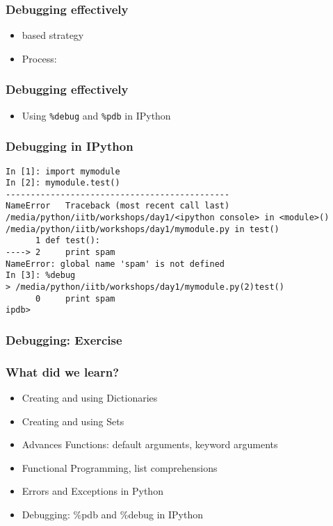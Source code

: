 \documentclass[14pt,compress]{beamer}
\newcounter{time}
\newcommand{\inctime}[1]{\addtocounter{time}{#1}{\tiny \thetime\ m}}
\newcommand{\typ}[1]{\texttt{#1}}
\newcommand{\kwrd}[1]{ \texttt{\textbf{\color{blue}{#1}}}  }
\begin{document}
\begin{frame}[fragile]
    \frametitle{Debugging effectively}
    \begin{itemize}
        \item \kwrd{print} based strategy
        \item Process:
    \end{itemize}
\end{frame}

\begin{frame}[fragile]
    \frametitle{Debugging effectively}
    \begin{itemize}
      \item Using \typ{\%debug} and \typ{\%pdb} in IPython
    \end{itemize}
\end{frame}

\begin{frame}[fragile]
\frametitle{Debugging in IPython}
\small
\begin{lstlisting}
In [1]: import mymodule
In [2]: mymodule.test()
---------------------------------------------
NameError   Traceback (most recent call last)
/media/python/iitb/workshops/day1/<ipython console> in <module>()
/media/python/iitb/workshops/day1/mymodule.py in test()
      1 def test():
----> 2     print spam
NameError: global name 'spam' is not defined
In [3]: %debug
> /media/python/iitb/workshops/day1/mymodule.py(2)test()
      0     print spam
ipdb> 
\end{lstlisting}
\inctime{15} 
\end{frame}

\begin{frame}[fragile]
\frametitle{Debugging: Exercise}
\inctime{10}
\end{frame}

\begin{frame}
  \frametitle{What did we learn?}
  \begin{itemize}
    \item Creating and using Dictionaries
    \item Creating and using Sets
    \item Advances Functions: default arguments, keyword arguments
    \item Functional Programming, list comprehensions
    \item Errors and Exceptions in Python
    \item Debugging: \%pdb and \%debug in IPython
  \end{itemize}
\end{frame}
\end{document}
